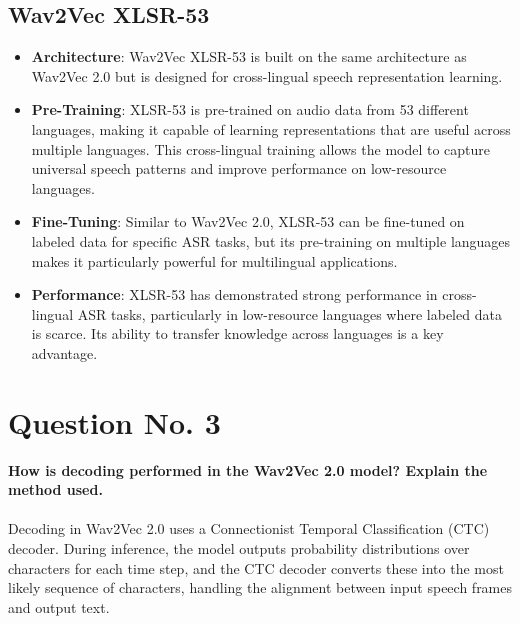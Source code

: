 \documentclass{article}
\begin{document}
\subsection{Wav2Vec XLSR-53}
\begin{itemize}
  \item \textbf{Architecture}: Wav2Vec XLSR-53 is built on the same architecture as Wav2Vec 2.0 but is designed for cross-lingual speech representation learning.
  \item \textbf{Pre-Training}: XLSR-53 is pre-trained on audio data from 53 different languages, making it capable of learning representations that are useful across multiple languages. This cross-lingual training allows the model to capture universal speech patterns and improve performance on low-resource languages.
  \item \textbf{Fine-Tuning}: Similar to Wav2Vec 2.0, XLSR-53 can be fine-tuned on labeled data for specific ASR tasks, but its pre-training on multiple languages makes it particularly powerful for multilingual applications.
  \item \textbf{Performance}: XLSR-53 has demonstrated strong performance in cross-lingual ASR tasks, particularly in low-resource languages where labeled data is scarce. Its ability to transfer knowledge across languages is a key advantage.
\end{itemize}


\pagebreak

\section{Question No. 3}
\textbf{How is decoding performed in the Wav2Vec 2.0 model? Explain the method used.}\\\\
Decoding in Wav2Vec 2.0 uses a Connectionist Temporal Classification (CTC) decoder. During inference, the model outputs probability distributions over characters for each time step, and the CTC decoder converts these into the most likely sequence of characters, handling the alignment between input speech frames and output text.
\end{document}
